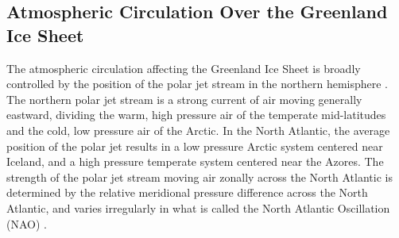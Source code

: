 \documentclass[11pt]{report}
\begin{document}
\subsection{Atmospheric Circulation Over the Greenland Ice Sheet}
The atmospheric circulation affecting the Greenland Ice Sheet is broadly controlled by the position of the polar jet stream in the northern hemisphere \cite[][]{hanna2013,mattingly2018}. The northern polar jet stream is a strong current of air moving generally eastward, dividing the warm, high pressure air of the temperate mid-latitudes and the cold, low pressure air of the Arctic. In the North Atlantic, the average position of the polar jet results in a low pressure Arctic system centered near Iceland, and a high pressure temperate system centered near the Azores. The strength of the polar jet stream moving air zonally across the North Atlantic is determined by the relative meridional pressure difference across the North Atlantic, and varies irregularly in what is called the North Atlantic Oscillation (NAO) \cite[][]{hurrelNAO}.


\end{document}
